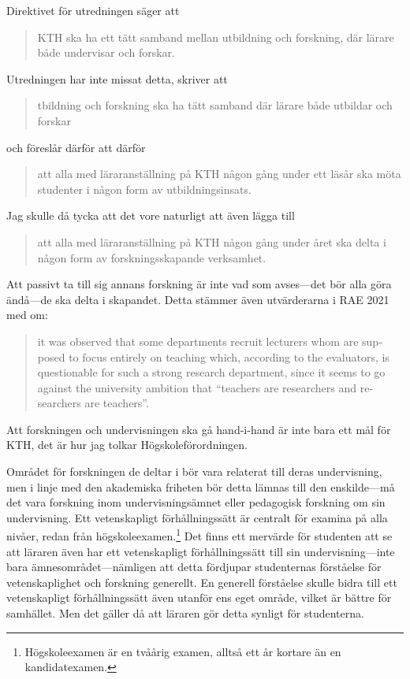 \documentclass[a4paper,oneside,article,swedish]{memoir}
\begin{document}
Direktivet för utredningen säger att
\blockcquote[s.~1]{direktiv}{%
  KTH ska ha ett tätt samband mellan utbildning och forskning, där lärare både 
  undervisar och forskar.%
}
Utredningen har inte missat detta, \textcite{utredning} skriver att
\blockcquote[s.~2]{utredning}{%
  tbildning och forskning ska ha tätt samband där lärare både 
  utbildar och forskar%
}
och föreslår därför att därför
\blockcquote[s-~2]{utredning}{%
  att alla med läraranställning på KTH någon gång under ett läsår ska möta 
  studenter i någon form av utbildningsinsats.%
}

Jag skulle då tycka att det vore naturligt att även lägga till
\blockquote{%
  att alla med läraranställning på KTH någon gång under året ska delta i någon 
  form av forskningsskapande verksamhet.%
}
Att passivt ta till sig annans forskning är inte vad som avses---det bör alla 
göra ändå---de ska delta i skapandet.
Detta stämmer även utvärderarna i RAE 2021 med om:
\blockcquote[s.~19, tack till Alexander Baltatzis som uppmärksammade mig på att 
RAE påtalat detta]{RAE2021}{\foreignlanguage{english}{%
  it was observed
  that some departments recruit lecturers whom are supposed
  to focus entirely on teaching which, according to the evaluators, is 
  questionable for such a strong research department,
  since it seems to go against the university ambition that
  \enquote{teachers are researchers and researchers are teachers}.%
}}
Att forskningen och undervisningen ska gå hand-i-hand är inte bara ett mål för 
KTH, det är hur jag tolkar Högskoleförordningen\autocite[jmf.\ att 4 kap.\ 
handlar om lärare]{Högskoleförordningen}.

Området för forskningen de deltar i bör vara relaterat till deras undervisning, 
men i linje med den akademiska friheten bör detta lämnas till den enskilde---må 
det vara forskning inom undervisningsämnet eller pedagogisk forskning om sin 
undervisning.
Ett vetenskapligt förhållningssätt är centralt för examina på alla nivåer, 
redan från högskoleexamen.\footnote{%
  Högskoleexamen är en tvåårig examen, alltså ett år kortare än en 
  kandidatexamen.
}\autocite[bilaga 2]{Högskoleförordningen}
Det finns ett mervärde för studenten att se att läraren även har ett 
vetenskapligt förhållningssätt till sin undervisning---inte bara 
ämnesområdet---nämligen att detta fördjupar studenternas förståelse för 
vetenskaplighet och forskning generellt\autocite{NCOL}.
En generell förståelse skulle bidra till ett vetenskapligt förhållningssätt 
även utanför ens eget område, vilket är bättre för samhället.
Men det gäller då att läraren gör detta synligt för studenterna.
\end{document}
